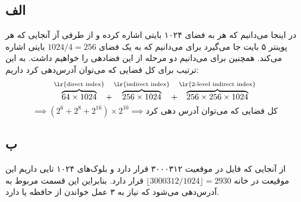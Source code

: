 \subsection*{الف}
در اینجا می‌دانیم که هر
به فضای ۱۰۲۴ بایتی اشاره کرده و از طرفی آز آنجایی که هر پوینتر ۵ بایت جا می‌گیرد برای
می‌دانیم که به یک فضای 
$1024/4 = 256$
بایتی اشاره می‌کند. همچنین برای 
می‌دانیم دو مرحله از این فضادهی را خواهیم داشت. به این ترتیب برای کل فضایی که می‌توان آدرس‌دهی کرد داریم:
\[
    \overbrace{64 \times 1024}^{\text{\lr{direct index}}} + \overbrace{256 \times 1024}^{\text{\lr{indirect index}}} + \overbrace{256 \times 256 \times 1024}^{\text{\lr{2-level indirect index}}}
\]
\[
    \implies (2^6 + 2^8 + 2^16) \times 2^10 \implies \text{کل فضایی که می‌توان آدرس دهی کرد}
\]

\subsection*{ب}
از آنجایی که فایل در موقعیت 
۳۰۰۰۳۱۲
قرار دارد و بلوک‌های ۱۰۲۴ تایی‌ داریم این موقیعت در خانه
\linebreak
$\lfloor 3000312 / 1024 \rfloor = 2930$
قرار دارد. بنا‌براین این قسمت مربوط به آدرس‌دهی
می‌شود که نیاز به ۳ عمل خواندن از حافظه یا 
دارد.